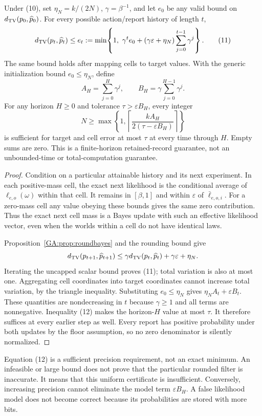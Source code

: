 \begin{GAtheorem}\label{GA:thm:finiteprecision}
Under (10), set $\eta_N=k/(2N)$, $\gamma=\beta^{-1}$, and let $e_0$ be any valid bound on $d_{\mathrm{TV}}(p_0,\widehat p_0)$. For every possible action/report history of length $t$,
\[
 d_{\mathrm{TV}}(p_t,\widehat p_t)\le e_t
 :=\min\!\left\{1,\ \gamma^t e_0+(\gamma\varepsilon+\eta_N)
                         \sum_{j=0}^{t-1}\gamma^j\right\}. \tag{11}
\]
The same bound holds after mapping cells to target values. With the generic initialization bound $e_0\le\eta_N$, define
\[
 A_H=\sum_{j=0}^{H}\gamma^j,\qquad
 B_H=\gamma\sum_{j=0}^{H-1}\gamma^j.
\]
For any horizon $H\ge0$ and tolerance $\tau>\varepsilon B_H$, every integer
\[
 N\ge \max\!\left\{1,\left\lceil
       \frac{kA_H}{2(\tau-\varepsilon B_H)}\right\rceil\right\} \tag{12}
\]
is sufficient for target and cell error at most $\tau$ at every time through $H$. Empty sums are zero. This is a finite-horizon retained-record guarantee, not an unbounded-time or total-computation guarantee.
\end{GAtheorem}
\begin{proof}
Condition on a particular attainable history and its next experiment. In each positive-mass cell, the exact next likelihood is the conditional average of $\ell_{e,o}(\omega)$ within that cell. It remains in $[\beta,1]$ and within $\varepsilon$ of $\bar\ell_{e,o,i}$. For a zero-mass cell any value obeying these bounds gives the same zero contribution. Thus the exact next cell mass is a Bayes update with such an effective likelihood vector, even when the worlds within a cell do not have identical laws.

Proposition~\ref{GA:prop:roundbayes} and the rounding bound give
\[
 d_{\mathrm{TV}}(p_{t+1},\widehat p_{t+1})
 \le\gamma d_{\mathrm{TV}}(p_t,\widehat p_t)+\gamma\varepsilon+\eta_N.
\]
Iterating the uncapped scalar bound proves (11); total variation is also at most one. Aggregating cell coordinates into target coordinates cannot increase total variation, by the triangle inequality. Substituting $e_0\le\eta_N$ gives $\eta_N A_t+\varepsilon B_t$. These quantities are nondecreasing in $t$ because $\gamma\ge1$ and all terms are nonnegative. Inequality (12) makes the horizon-$H$ value at most $\tau$. It therefore suffices at every earlier step as well. Every report has positive probability under both updates by the floor assumption, so no zero denominator is silently normalized.
\end{proof}

Equation (12) is a sufficient precision requirement, not an exact minimum. An infeasible or large bound does not prove that the particular rounded filter is inaccurate. It means that this uniform certificate is insufficient. Conversely, increasing precision cannot eliminate the model term $\varepsilon B_H$. A false likelihood model does not become correct because its probabilities are stored with more bits.

